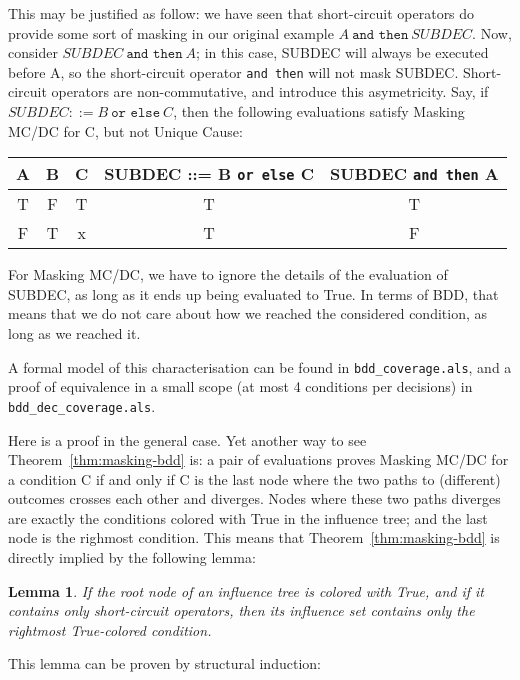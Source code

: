 \documentclass[a4paper,12pt,twoside]{article}
\newcommand{\andthen}{\texttt{and then}}
\newcommand{\orelse}{\texttt{or else}}
\newtheorem{lemma}{Lemma}[subsection]
\begin{document}
This may be justified as follow: we have seen that short-circuit operators
do provide some sort of masking in our original example
$A \ \andthen{} \ SUBDEC$. Now, consider $SUBDEC \ \andthen{} \ A$; in this
case, SUBDEC will always be executed before A, so the short-circuit operator
\andthen{} will not mask SUBDEC. Short-circuit operators are non-commutative,
and introduce this asymetricity. Say, if $SUBDEC ::= B \ \orelse \ C$, then
the following evaluations satisfy Masking MC/DC for C, but not Unique Cause:

\begin{center}
\begin{tabular}{|c|c|c||c||c|}
\hline
A & B & C & SUBDEC ::= B \orelse{} C & SUBDEC \andthen{} A \\ \hline
T & F & T & T                        & T \\ \hline
F & T & x & T                        & F \\ \hline
\end{tabular}
\end{center}

For Masking MC/DC, we have to ignore the details of the evaluation of SUBDEC,
as long as it ends up being evaluated to True. In terms of BDD, that means
that we do not care about how we reached the considered condition, as long
as we reached it.

A formal model of this characterisation can be found in
\verb|bdd_coverage.als|, and a proof of equivalence in a small scope
(at most 4 conditions per decisions) in \verb|bdd_dec_coverage.als|.

Here is a proof in the general case. Yet another way to see
Theorem~\ref{thm:masking-bdd} is: a pair of evaluations proves Masking
MC/DC for a condition C if and only if C is the last node where the
two paths to (different) outcomes crosses each other and
diverges. Nodes where these two paths diverges are exactly the
conditions colored with True in the influence tree; and the last node
is the righmost condition.  This means that
Theorem~\ref{thm:masking-bdd} is directly implied by the following
lemma:

\begin{lemma}
  \label{lemma:short-circuit-influence-set}
  If the root node of an influence tree is colored with True, and
  if it contains only short-circuit operators, then its influence
  set contains only the rightmost True-colored condition.
\end{lemma}

This lemma can be proven by structural induction:
\end{document}
